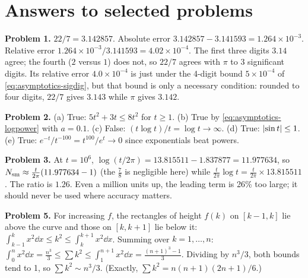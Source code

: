 \begin{problemlist}

\end{problemlist}

\section{Answers to selected problems}\label{sec:asymptotics-answers}

\textbf{Problem 1.} $22/7=3.142857$. Absolute error $3.142857-3.141593=1.264\times10^{-3}$. Relative error $1.264\times10^{-3}/3.141593=4.02\times10^{-4}$. The first three digits $3.14$ agree; the fourth ($2$ versus $1$) does not, so $22/7$ agrees with $\pi$ to 3 significant digits. Its relative error $4.0\times10^{-4}$ is just under the 4-digit bound $5\times10^{-4}$ of \cref{eq:asymptotics-sigdig}, but that bound is only a necessary condition: rounded to four digits, $22/7$ gives $3.143$ while $\pi$ gives $3.142$.

\textbf{Problem 2.} (a) True: $5t^2+3t\le8t^2$ for $t\ge1$. (b) True by \cref{eq:asymptotics-logpower} with $a=0.1$. (c) False: $(t\log t)/t=\log t\to\infty$. (d) True: $\left\lvert \sin t\right\rvert\le1$. (e) True: $e^{-t}/t^{-100}=t^{100}/e^{t}\to0$ since exponentials beat powers.

\textbf{Problem 3.} At $t=10^6$, $\log(t/2\pi)=13.815511-1.837877=11.977634$, so $N_{\mathrm{sm}}\approx\frac{t}{2\pi}(11.977634-1)$ (the $\tfrac78$ is negligible here) while $\frac t{2\pi}\log t=\frac t{2\pi}\times13.815511$. The ratio is $1.26$. Even a million units up, the leading term is 26\% too large; it should never be used where accuracy matters.

\textbf{Problem 5.} For increasing $f$, the rectangles of height $f(k)$ on $[k-1,k]$ lie above the curve and those on $[k,k+1]$ lie below it: $\int_{k-1}^{k}x^2\dd x\le k^2\le\int_k^{k+1}x^2\dd x$. Summing over $k=1,\dots,n$: $\int_0^nx^2\dd x=\frac{n^3}{3}\le\sum k^2\le\int_1^{n+1}x^2\dd x=\frac{(n+1)^3-1}{3}$. Dividing by $n^3/3$, both bounds tend to 1, so $\sum k^2\sim n^3/3$. (Exactly, $\sum k^2=n(n+1)(2n+1)/6$.)

